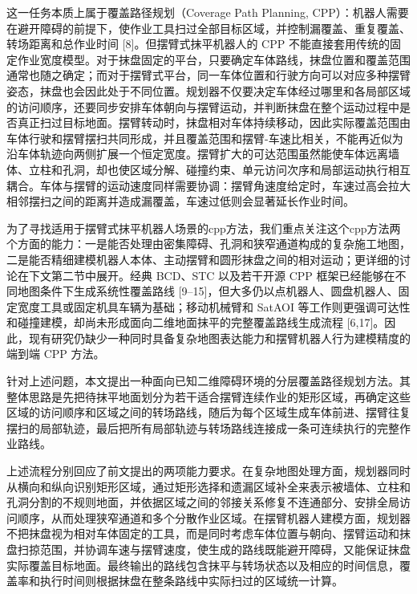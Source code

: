 这一任务本质上属于覆盖路径规划（Coverage Path Planning, CPP）：机器人需要在避开障碍的前提下，使作业工具扫过全部目标区域，并控制漏覆盖、重复覆盖、转场距离和总作业时间 [8]。但摆臂式抹平机器人的 CPP 不能直接套用传统的固定作业宽度模型。对于抹盘固定的平台，只要确定车体路线，抹盘位置和覆盖范围通常也随之确定；而对于摆臂式平台，同一车体位置和行驶方向可以对应多种摆臂姿态，抹盘也会因此处于不同位置。规划器不仅要决定车体经过哪里和各局部区域的访问顺序，还要同步安排车体朝向与摆臂运动，并判断抹盘在整个运动过程中是否真正扫过目标地面。摆臂转动时，抹盘相对车体持续移动，因此实际覆盖范围由车体行驶和摆臂摆扫共同形成，并且覆盖范围和摆臂-车速比相关，不能再近似为沿车体轨迹向两侧扩展一个恒定宽度。摆臂扩大的可达范围虽然能使车体远离墙体、立柱和孔洞，却也使区域分解、碰撞约束、单元访问次序和局部运动执行相互耦合。车体与摆臂的运动速度同样需要协调：摆臂角速度给定时，车速过高会拉大相邻摆扫之间的距离并造成漏覆盖，车速过低则会显著延长作业时间。

  

为了寻找适用于摆臂式抹平机器人场景的cpp方法，我们重点关注这个cpp方法两个方面的能力：一是能否处理由密集障碍、孔洞和狭窄通道构成的复杂施工地图，二是能否精细建模机器人本体、主动摆臂和圆形抹盘之间的相对运动；更详细的讨论在下文第二节中展开。经典 BCD、STC 以及若干开源 CPP 框架已经能够在不同地图条件下生成系统性覆盖路线 [9–15]，但大多仍以点机器人、圆盘机器人、固定宽度工具或固定机具车辆为基础；移动机械臂和 SatAOI 等工作则更强调可达性和碰撞建模，却尚未形成面向二维地面抹平的完整覆盖路线生成流程 [6,17]。因此，现有研究仍缺少一种同时具备复杂地图表达能力和摆臂机器人行为建模精度的端到端 CPP 方法。

  

针对上述问题，本文提出一种面向已知二维障碍环境的分层覆盖路径规划方法。其整体思路是先把待抹平地面划分为若干适合摆臂连续作业的矩形区域，再确定这些区域的访问顺序和区域之间的转场路线，随后为每个区域生成车体前进、摆臂往复摆扫的局部轨迹，最后把所有局部轨迹与转场路线连接成一条可连续执行的完整作业路线。



上述流程分别回应了前文提出的两项能力要求。在复杂地图处理方面，规划器同时从横向和纵向识别矩形区域，通过矩形选择和遗漏区域补全来表示被墙体、立柱和孔洞分割的不规则地面，并依据区域之间的邻接关系修复不连通部分、安排全局访问顺序，从而处理狭窄通道和多个分散作业区域。在摆臂机器人建模方面，规划器不把抹盘视为相对车体固定的工具，而是同时考虑车体位置与朝向、摆臂运动和抹盘扫掠范围，并协调车速与摆臂速度，使生成的路线既能避开障碍，又能保证抹盘实际覆盖目标地面。最终输出的路线包含抹平与转场状态以及相应的时间信息，覆盖率和执行时间则根据抹盘在整条路线中实际扫过的区域统一计算。

